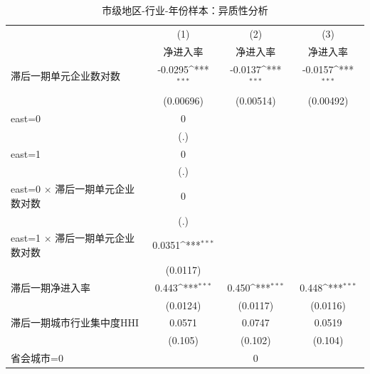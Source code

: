 \begin{table}[htbp]\centering
\def\sym#1{\ifmmode^{#1}\else\(^{#1}\)\fi}
\caption{市级地区-行业-年份样本：异质性分析}
\begin{tabular}{l*{3}{c}}
\toprule
                    &\multicolumn{1}{c}{(1)}&\multicolumn{1}{c}{(2)}&\multicolumn{1}{c}{(3)}\\
                    &\multicolumn{1}{c}{净进入率}&\multicolumn{1}{c}{净进入率}&\multicolumn{1}{c}{净进入率}\\
\midrule
滞后一期单元企业数对数&     -0.0295\sym{***}&     -0.0137\sym{***}&     -0.0157\sym{***}\\
                    &   (0.00696)         &   (0.00514)         &   (0.00492)         \\
\addlinespace
east=0              &           0         &                     &                     \\
                    &         (.)         &                     &                     \\
\addlinespace
east=1              &           0         &                     &                     \\
                    &         (.)         &                     &                     \\
\addlinespace
east=0 $\times$ 滞后一期单元企业数对数&           0         &                     &                     \\
                    &         (.)         &                     &                     \\
\addlinespace
east=1 $\times$ 滞后一期单元企业数对数&      0.0351\sym{***}&                     &                     \\
                    &    (0.0117)         &                     &                     \\
\addlinespace
滞后一期净进入率    &       0.443\sym{***}&       0.450\sym{***}&       0.448\sym{***}\\
                    &    (0.0124)         &    (0.0117)         &    (0.0116)         \\
\addlinespace
滞后一期城市行业集中度HHI&      0.0571         &      0.0747         &      0.0519         \\
                    &     (0.105)         &     (0.102)         &     (0.104)         \\
\addlinespace
省会城市=0          &                     &           0         &                     \\

\end{tabular}
\end{table}
